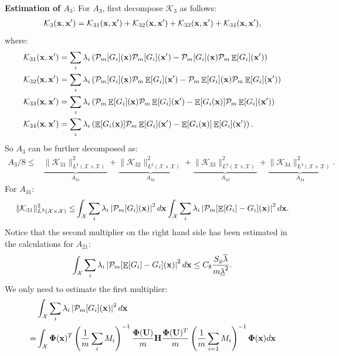 \documentclass[aos,preprint]{imsart}
\theoremstyle{plain}
\DeclareMathOperator{\E}{\mathbb E}
\newcommand{\CalX}{\mathcal X}
\newcommand{\CalP}{\mathcal P}
\newcommand{\CalK}{\mathcal K}
\newcommand{\Bx}{\bold x}
\newcommand{\BFx}{\bold x}
\newcommand{\BU}{\bold U}
\newcommand{\BPhi}{\boldsymbol{\Phi}}
\theoremstyle{remark}
\begin{document}
\begin{appendix}
{\large \textbf{Estimation of $A_3$}}: For $A_3$, first decompose $\CalK_3$ as follows:
\begin{align*}
    \CalK_3(\Bx,\Bx')=\CalK_{31}(\Bx,\Bx')+\CalK_{32}(\Bx,\Bx')+\CalK_{33}(\Bx,\Bx')+\CalK_{34}(\Bx,\Bx'),
\end{align*}
where:
\begin{align*}
    &\CalK_{31}(\Bx,\Bx')=\sum_i\lambda_i\left(\CalP_m[G_i](\Bx)\CalP_m[G_i](\BFx')-\CalP_m[G_i](\BFx)\CalP_m\E[G_i](\BFx')\right)\\
    &\CalK_{32}(\Bx,\Bx')=\sum_i\lambda_i\left(\CalP_m[G_i](\BFx)\CalP_m\E[G_i](\BFx')-\CalP_m\E[G_i](\BFx)\CalP_m\E[G_i](\Bx')\right)\\
    &\CalK_{33}(\Bx,\Bx')=\sum_i\lambda_i\left(\CalP_m\E[G_i](\BFx)\CalP_m\E[G_i](\BFx')-\E[G_i(\BFx)]\CalP_m\E[G_i](\BFx')\right)\\
    &\CalK_{34}(\Bx,\Bx')=\sum_i\lambda_i\left(\E[G_i(\BFx)]\CalP_m\E[G_i](\BFx')-\E[G_i(\BFx)]\E[G_i](\BFx')\right).
\end{align*}
So $A_3$ can be further decomposed as:
\begin{align}
    A_3/8\leq &\underbrace{ \|\CalK_{31}\|_{L^2(\CalX\times\CalX)}^2 }_{A_{31}}+\underbrace{ \|\CalK_{32}\|_{L^2(\CalX\times\CalX)}^2 }_{A_{32}} +\underbrace{ \|\CalK_{33}\|_{L^2(\CalX\times\CalX)}^2 }_{A_{33}}+\underbrace{ \|\CalK_{34}\|_{L^2(\CalX\times\CalX)}^2 }_{A_{34}}.\label{eq_pf_general_convergence_10}
\end{align}
For $A_{31}$:
\begin{align*}
    \|\CalK_{31}\|_{L^2(\CalX\times\CalX)}^2\leq &\int_{\CalX}\sum_i\lambda_i\left|\CalP_m[G_i](\BFx)\right|^2d\BFx\int_{\CalX}\sum_i\lambda_i\left|\CalP_m[ \E[G_i]-G_i](\BFx)\right|^2d\BFx.\\
\end{align*}
Notice that the second multiplier on the right hand side has been estimated in the calculations for $A_{21}$:
\begin{equation}
    \int_{\CalX}\sum_i\lambda_i\left|\CalP_m[ \E[G_i]-G_i](\BFx)\right|^2d\BFx \leq C_8\frac{S_\phi\overline{\lambda}}{m\underline{\lambda}^2}. \label{eq_pf_general_convergence_11}
\end{equation}
We only need to estimate the first multiplier:
\begin{align*}
   &\int_{\CalX}\sum_i\lambda_i\left|\CalP_m[G_i](\BFx)\right|^2d\BFx\\
   =&\int_\CalX \BPhi(\BFx)^T\left(\frac{1}{m}\sum_iM_i\right)^{-1}\frac{\BPhi(\BU)}{m}\bold{H}\frac{\BPhi(\BU)^T}{m}\left(\frac{1}{m}\sum_{i=1}M_i\right)^{-1}\BPhi(\Bx)d\BFx\\

\end{align*}
\end{appendix}
\end{document}
